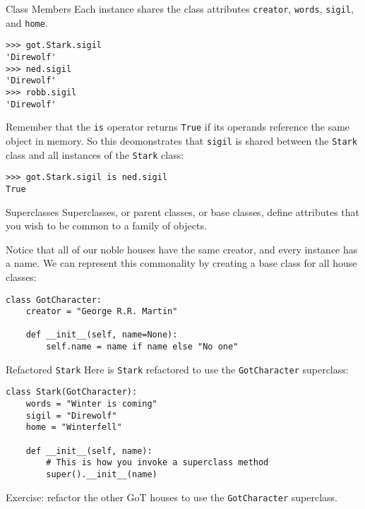 \documentclass[smaller]{beamer}
\begin{document}
\begin{frame}[fragile,label=sec-1-6]{Class Members}
 Each instance shares the class attributes \verb~creator~, \verb~words~, \verb~sigil~, and \verb~home~.

\lstset{language=Python,label= ,caption= ,numbers=none}
\begin{lstlisting}
>>> got.Stark.sigil
'Direwolf'
>>> ned.sigil
'Direwolf'
>>> robb.sigil
'Direwolf'
\end{lstlisting}

Remember that the \verb~is~ operator returns \verb~True~ if its operands reference the same object in memory. So this deomonstrates that \verb~sigil~ is shared between the \verb~Stark~ class and all instances of the \verb~Stark~ class:

\lstset{language=Python,label= ,caption= ,numbers=none}
\begin{lstlisting}
>>> got.Stark.sigil is ned.sigil
True
\end{lstlisting}
\end{frame}


\begin{frame}[fragile,label=sec-1-7]{Superclasses}
 Superclasses, or parent classes, or base classes, define attributes that you wish to be common to a family of objects.

Notice that all of our noble houses have the same creator, and every instance has a name. We can represent this commonality by creating a base class for all house classes:

\lstset{language=Python,label= ,caption= ,numbers=none}
\begin{lstlisting}
class GotCharacter:
    creator = "George R.R. Martin"

    def __init__(self, name=None):
        self.name = name if name else "No one"
\end{lstlisting}
\end{frame}

\begin{frame}[fragile,label=sec-1-8]{Refactored \verb~Stark~}
 Here is \verb~Stark~ refactored to use the \verb~GotCharacter~ superclass:

\lstset{language=Python,label= ,caption= ,numbers=none}
\begin{lstlisting}
class Stark(GotCharacter):
    words = "Winter is coming"
    sigil = "Direwolf"
    home = "Winterfell"

    def __init__(self, name):
        # This is how you invoke a superclass method
        super().__init__(name)
\end{lstlisting}

Exercise: refactor the other GoT houses to use the \verb~GotCharacter~ superclass.
\end{frame}
\end{document}

